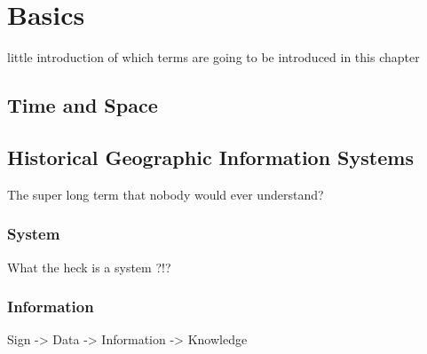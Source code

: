 
\section{Basics} %
\label{sec:basics}

little introduction of which terms are going to be introduced in this chapter



\subsection{Time and Space} %
\label{sub:time_and_space}






\subsection{Historical Geographic Information Systems} %
\label{sub:historical_geographic_information_systems}

The super long term that nobody would ever understand?


\subsubsection{System} %
\label{ssub:system}

What the heck is a system ?!?



\subsubsection{Information} %
\label{ssub:information}

Sign -> Data -> Information -> Knowledge



